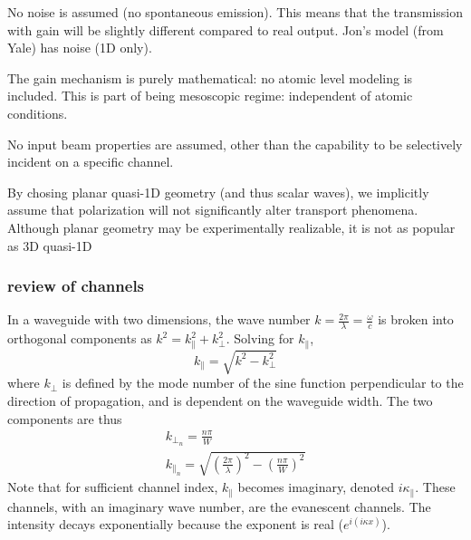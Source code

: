 No noise is assumed (no spontaneous emission). This means that the transmission with gain will be slightly different compared to real output. Jon's model (from Yale) has noise (1D only).

The gain mechanism is purely mathematical: no atomic level modeling is included. This is part of being mesoscopic regime: independent of atomic conditions.

No input beam properties are assumed, other than the capability to be selectively incident on a specific channel.

By chosing planar quasi-1D geometry (and thus scalar waves), we implicitly assume that polarization will not significantly alter transport phenomena. Although planar geometry may be experimentally realizable, it is not as popular as 3D quasi-1D




\subsubsection{review of channels}

In a waveguide with two dimensions, the wave number $k = \frac{2 \pi}{\lambda} = \frac{\omega}{c}$ is broken into orthogonal components as $k^2 = k_{\parallel}^2 + k_{\bot}^2$. Solving for $k_{\parallel}$,
\begin{equation}
k_{\parallel} = \sqrt{k^2 - k_{\bot}^2}
\end{equation}
where $k_{\bot}$ is defined by the mode number of the sine function perpendicular to the direction of propagation, and is dependent on the waveguide width. %
The two components are thus
\begin{equation}
 \begin{gathered}
  k_{\bot_n} =  \frac{n \pi}{W} \\
  k_{\parallel_n} = \sqrt{\left( \frac{2 \pi}{\lambda} \right)^2 - \left(\frac{n \pi}{W}\right)^2}
 \end{gathered}
\label{eq:wave_number_quasi1d}
\end{equation}
Note that for sufficient channel index, $k_{\parallel}$ becomes imaginary, denoted $i \kappa_{\parallel}$.  These channels, with an imaginary wave number, are the evanescent channels. The intensity decays exponentially because the exponent is real ($e^{i(i\kappa x)}$). 


